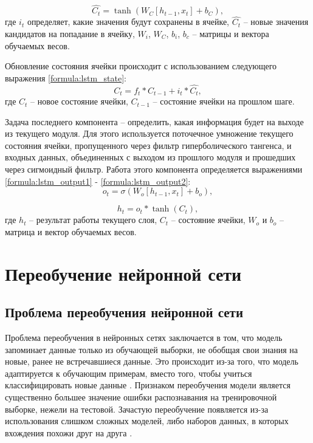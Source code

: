 \begin{equation}\label{formula:lstm_input2}
	\hat{C_t} = \tanh(W_C[h_{t-1}, x_t] + b_C),
\end{equation}
где $i_t$ определяет, какие значения будут сохранены в ячейке, $\hat{C_t}$ -- новые значения кандидатов на попадание в ячейку, $W_i$, $W_C$, $b_i$, $b_c$ -- матрицы и вектора обучаемых весов.

Обновление состояния ячейки происходит с использованием следующего выражения \ref{formula:lstm_state}:
\begin{equation}\label{formula:lstm_state}
	C_t = f_t * C_{t-1} + i_t*\hat{C_t},
\end{equation}
где $C_t$ -- новое состояние ячейки, $C_{t-1}$ -- состояние ячейки на прошлом шаге.

Задача последнего компонента -- определить, какая информация будет на выходе из текущего модуля.
Для этого используется поточечное умножение текущего состояния ячейки, пропущенного через фильтр гиперболического тангенса, и входных данных, объединенных с выходом из прошлого модуля и прошедших через сигмоидный фильтр.
Работа этого компонента определяется выражениями \ref{formula:lstm_output1} - \ref{formula:lstm_output2}:
\begin{equation}\label{formula:lstm_output1}
	o_t = \sigma(W_o[h_{t-1}, x_t] + b_o),
\end{equation}

\begin{equation}\label{formula:lstm_output2}
	h_t = o_t * \tanh(C_t),
\end{equation}
где $h_t$ -- результат работы текущего слоя, $C_t$ -- состояние ячейки, $W_o$ и $b_o$ -- матрица и вектор обучаемых весов.

\section{Переобучение нейронной сети}
\subsection{Проблема переобучения нейронной сети}\label{sec:retraining}
Проблема переобучения в нейронных сетях заключается в том, что модель запоминает данные только из обучающей выборки, не обобщая свои знания на новые, ранее не встречавшиеся данные. Это происходит из-за того, что модель адаптируется к обучающим примерам, вместо того, чтобы учиться классифицировать новые данные \cite{overtraining1}. Признаком переобучения модели является существенно большее значение ошибки распознавания на тренировочной выборке, нежели на тестовой. Зачастую переобучение появляется из-за использования слишком сложных моделей, либо наборов данных, в которых вхождения похожи друг на друга \cite{overtraining1}.

